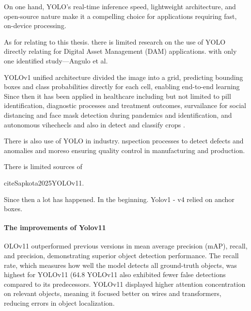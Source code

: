 \documentclass[a4paper,10pt,twocolumn]{article}
\numberwithin{figure}{section}
\numberwithin{table}{section}
\begin{document}
\citep{alif2025yolov12}


On one hand, YOLO’s real-time inference speed, lightweight architecture, 
and open-source nature make it a compelling choice for applications 
requiring fast, on-device processing. 

 As for relating to this thesis. there is limited research on the use of YOLO 
directly relating for Digital Asset Management (DAM) applications. with only one identified 
study—Angulo et al. 








 
 
 
 
 YOLOv1 unified architecture divided the image into a grid, predicting bounding boxes and
 class probabilities directly for each cell, enabling end-to-end learning
Since then it has been applied in healthcare including but not limited to pill identification, diagnostic processes and treatment outcomes, 
survailance for social distancing and face mask detection during pandemics and identification, and 
autonomous vihechecls and also in detect and classify crops \cite{Sapkota2025YOLOv11}. 

There is also use of YOLO in industry. nspection processes to detect defects and anomalies
and moreso ensuring quality control in manufacturing and production.

There is limited sources of 

cite{Sapkota2025YOLOv11}. 



Since then a lot has happened. In the beginning. Yolov1 - v4 relied on anchor boxes. 

\paragraph{The improvements of Yolov11}


OLOv11 outperformed previous versions in mean average precision (mAP), recall, and precision, demonstrating superior object detection performance.
The recall rate, which measures how well the model detects all ground-truth objects, was highest for YOLOv11 (64.8%
YOLOv11 also exhibited fewer false detections compared to its predecessors.
YOLOv11 displayed higher attention concentration on relevant objects, meaning it focused better on wires and transformers, reducing errors in object localization.
\end{document}
